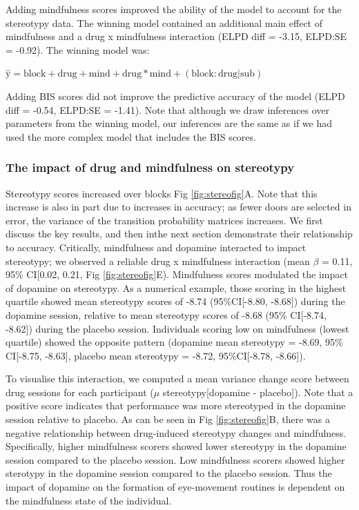\documentclass[
  man]{apa6}
\begin{document}
Adding mindfulness scores improved the ability of the model to account for the stereotypy data. The winning model contained an additional main effect of mindfulness and a drug x mindfulness interaction (ELPD diff = -3.15, ELPD:SE = -0.92). The winning model was:

\(\mathrm{\hat{y}} = \mathrm{block} + \mathrm{drug} + \mathrm{mind} + \mathrm{drug*mind} + \mathrm{(block:drug|sub)}\)

Adding BIS scores did not improve the predictive accuracy of the model (ELPD diff = -0.54, ELPD:SE = -1.41). Note that although we draw inferences over parameters from the winning model, our inferences are the same as if we had used the more complex model that includes the BIS scores.

\hypertarget{the-impact-of-drug-and-mindfulness-on-stereotypy}{%
\subsubsection{The impact of drug and mindfulness on stereotypy}\label{the-impact-of-drug-and-mindfulness-on-stereotypy}}

Stereotypy scores increased over blocks Fig \ref{fig:stereofig}A. Note that this increase is also in part due to increases in accuracy; as fewer doors are selected in error, the variance of the transition probability matrices increases. We first discuss the key results, and then inthe next section demonstrate their relationship to accuracy. Critically, mindfulness and dopamine interacted to impact stereotypy; we observed a reliable drug x mindfulness interaction (mean \(\beta\) = 0.11, 95\% CI{[}0.02, 0.21, Fig \ref{fig:stereofig}E). Mindfulness scores modulated the impact of dopamine on stereotypy. As a numerical example, those scoring in the highest quartile showed mean stereotypy scores of -8.74 (95\%CI{[}-8.80, -8.68{]}) during the dopamine session, relative to mean stereotypy scores of -8.68 (95\% CI{[}-8.74, -8.62{]}) during the placebo session. Individuals scoring low on mindfulness (lowest quartile) showed the opposite pattern (dopamine mean stereotypy = -8.69, 95\% CI{[}-8.75, -8.63{]}, placebo mean stereotypy = -8.72, 95\%CI{[}-8.78, -8.66{]}).

To visualise this interaction, we computed a mean variance change score between drug sessions for each participant (\(\mu\) stereotypy{[}dopamine - placebo{]}). Note that a positive score indicates that performance was more stereotyped in the dopamine session relative to placebo. As can be seen in Fig \ref{fig:stereofig}B, there was a negative relationship between drug-induced stereotypy changes and mindfulness. Specifically, higher mindfulness scorers showed lower stereotypy in the dopamine session compared to the placebo session. Low mindfulness scorers showed higher sterotypy in the dopamine session compared to the placebo session. Thus the impact of dopamine on the formation of eye-movement routines is dependent on the mindfulness state of the individual.
\end{document}

